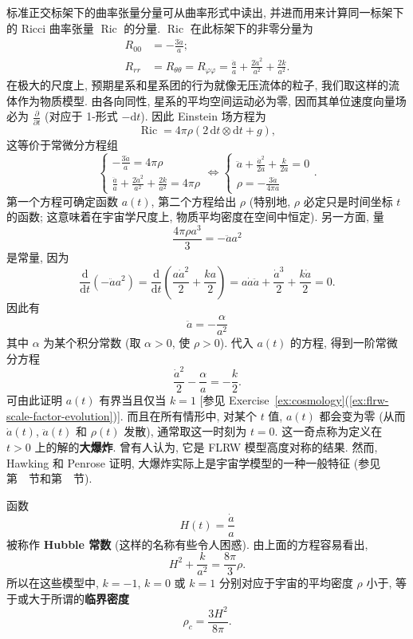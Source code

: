 标准正交标架下的曲率张量分量可从曲率形式中读出, 并进而用来计算同一标架下的 Ricci 曲率张量 $\operatorname{Ric}$ 的分量. $\operatorname{Ric}$ 在此标架下的非零分量为
\begin{align*}
  R_{00}&=-\frac{3\ddot a}{a};\\
  R_{rr}&=R_{\theta\theta}=R_{\varphi\varphi}
       =\frac{\ddot a}{a}+\frac{2\dot a^2}{a^2}+\frac{2k}{a^2}.
\end{align*}
在极大的尺度上, 预期星系和星系团的行为就像无压流体的粒子, 我们取这样的流体作为物质模型. 由各向同性, 星系的平均空间运动必为零, 因而其单位速度向量场必为 $\frac{\partial}{\partial t}$ (对应于 1-形式 $-\mathrm{d}t$). 因此 Einstein 场方程为
\[
  \operatorname{Ric}=4\pi\rho(2\,\mathrm{d}t\otimes\mathrm{d}t+g),
\]
这等价于常微分方程组
\[
  \begin{cases}
    \displaystyle-\frac{3\ddot a}{a}=4\pi\rho\\[.5ex]
    \displaystyle\frac{\ddot a}{a}+\frac{2\dot a^2}{a^2}+\frac{2k}{a^2}=4\pi\rho
  \end{cases}
  \iff
  \begin{cases}
    \displaystyle\ddot a+\frac{\dot a^2}{2a}+\frac{k}{2a}=0\\[.5ex]
    \displaystyle\rho=-\frac{3\ddot a}{4\pi a}
  \end{cases}.
\]
第一个方程可确定函数 $a(t)$, 第二个方程给出 $\rho$ (特别地, $\rho$ 必定只是时间坐标 $t$ 的函数; 这意味着在宇宙学尺度上, 物质平均密度在空间中恒定). 另一方面, 量
\[
  \frac{4\pi\rho a^3}{3}=-\ddot a a^2
\]
是常量, 因为
\[
  \frac{\mathrm{d}}{\mathrm{d}t}(-\ddot a a^2)
    =\frac{\mathrm{d}}{\mathrm{d}t}\left(\frac{a\dot a^2}{2}+\frac{ka}{2}\right)
    =a\dot a\ddot a+\frac{\dot a^3}{2}+\frac{k\dot a}{2}=0.
\]
因此有
\[
  \ddot a=-\frac{\alpha}{a^2}
\]
其中 $\alpha$ 为某个积分常数 (取 $\alpha>0$, 使 $\rho>0$). 代入 $a(t)$ 的方程, 得到一阶常微分方程
\[
  \frac{\dot a^2}{2}-\frac{\alpha}{a}=-\frac{k}{2}.
\]
可由此证明 $a(t)$ 有界当且仅当 $k=1$ [参见 Exercise~\ref{ex:cosmology}(\ref{ex:flrw-scale-factor-evolution})]. 而且在所有情形中, 对某个 $t$ 值, $a(t)$ 都会变为零 (从而 $\dot a(t)$, $\ddot a(t)$ 和 $\rho(t)$ 发散), 通常取这一时刻为 $t=0$. 这一奇点称为定义在 $t>0$ 上的解的\label{idx:big-bang}\textbf{大爆炸}. 曾有人认为, 它是 FLRW 模型高度对称的结果. 然而, Hawking 和 Penrose 证明, 大爆炸实际上是宇宙学模型的一种一般特征 (参见第~~节和第~~节).

函数
\[
  H(t)=\frac{\dot a}{a}
\]
被称作 \textbf{Hubble 常数} (这样的名称有些令人困惑). 由上面的方程容易看出,
\[
  H^2+\frac{k}{a^2}=\frac{8\pi}{3}\rho.
\]
所以在这些模型中, $k=-1$, $k=0$ 或 $k=1$ 分别对应于宇宙的平均密度 $\rho$ 小于, 等于或大于所谓的\textbf{临界密度}
\[
  \rho_c=\frac{3H^2}{8\pi}.
\]

